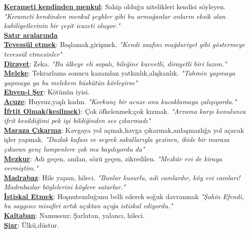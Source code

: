 \documentclass[twocolumn]{article}
\begin{document}
\noindent \underline{\textbf{Kerameti kendinden menkul}}:\textsf{ Sahip olduğu nitelikleri kendisi söyleyen. }\textit{"Kerameti kendinden menkul şeyhler gibi bu armağanlar onların eksik olan kabiliyetlerinin bir çeşit icazeti oluyor."} \\
\noindent \underline{\textbf{Satır aralarında}} \\
\noindent \underline{\textbf{Tevessül etmek}}:\textsf{ Başlamak,girişmek. }\textit{"Kendi zaafını mağduriyet gibi göstermeye tevessül etmesinler"} \\
\noindent \underline{\textbf{Dirayet}}:\textsf{ Zeka. }\textit{"Bu ülkeye eli sopalı, bileğine kuvvetli, dirayetli biri lazım."} \\
\noindent \underline{\textbf{Meleke}}:\textsf{ Tekrarlama sonucu kazanılan yatkınlık,alışkanlık. }\textit{"Tahmin yapmaya yapmaya ya bu melekem büsbütün körleşirse"} \\
\noindent \underline{\textbf{Ehven-i Şer}}:\textsf{ Kötünün iyisi. }\textit{} \\
\noindent \underline{\textbf{Acuze}}:\textsf{ Huysuz,yaşlı kadın. }\textit{"Korkunç bir acuze onu kucaklamaya çalışıyordu."} \\
\noindent \underline{\textbf{İfrtit Olmak(kesilmek)}}:\textsf{ Çok öfkelenmek;çok kızmak. }\textit{"Arzuma karşı konulunca ifrit kesildiğimi pek iyi bildiğinden ses çıkarmadı"} \\
\noindent \underline{\textbf{Maraza Çıkarma}}:\textsf{ Kavgaya yol açmak,kavga çıkarmak,anlaşmazlığa yol açacak işler yapmak. }\textit{"Dazlak kafası ve seyrek sakallarıyla gezinen, ikide bir maraza çıkaran genç lumpenlere çok mu bayılıyordu da"} \\
\noindent \underline{\textbf{Mezkur}}:\textsf{ Adı geçen, anılan, sözü geçen, zikredilen. }\textit{"Mezkûr evi de kiraya vermiştim."} \\
\noindent \underline{\textbf{Madrabaz}}:\textsf{ Hile yapan, hileci. }\textit{"Bunlar kusurlu, adi camlardır, köy evi camları! Madrabazlar böylelerini köylere satarlar."} \\
\noindent \underline{\textbf{İstiskal Etmek}}:\textsf{ Hoşnutsuzluğunu belli ederek soğuk davranmak }\textit{"Şahin Efendi, bu saygısız misafiri artık açıktan açığa istiskal ediyordu."} \\
\noindent \underline{\textbf{Kaltaban}}:\textsf{ Namussuz; Şarlatan, yalancı, hileci.}\textit{} \\
\noindent \underline{\textbf{Şiar}}:\textsf{ Ülkü,düstur. }\textit{} \\
\end{document}
